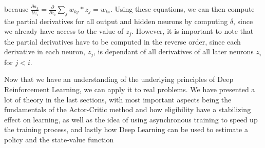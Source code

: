 \documentclass[11pt]{article}
\begin{document}
because $\frac{\partial a_k}{\partial z_i} = \frac{\partial}{\partial z_i} \sum_{j} w_{kj} * z_j = w_{ki}$.
Using these equations, we can then compute the partial derivatives for all output and hidden neurons
by computing $\delta$, since we already have access to the value of $z_j$.
However, it is important to note that the partial derivatives have to be computed in the reverse order,
since each derivative in each neuron, $z_j$, is dependant of all derivatives of all later neurons $z_i$ for $j < i$.



Now that we have an understanding of the underlying principles of Deep Reinforcement Learning, we can apply it to real problems.
We have presented a lot of theory in the last sections,
with most important aspects being the fundamentals of the Actor-Critic method and how eligibility have a stabilizing effect on learning,
as well as the idea of using asynchronous training to speed up the training process, and lastly
how Deep Learning can be used to estimate a policy and the state-value function
\end{document}

